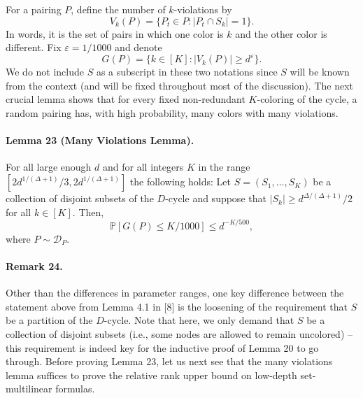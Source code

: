 For a pairing $P$, define the number of $k$-violations by
\[V_k(P)=\{P_t\in P:|P_t\cap S_k|=1\}.\]
In words, it is the set of pairs in which one color is $k$ and the other color is different. Fix $\varepsilon=1/1000$ and denote
\[G(P)=\{k\in[K]:|V_k(P)|\geq d^\varepsilon\}.\]
We do not include $S$ as a subscript in these two notations since $S$ will be known from the context (and will be fixed throughout most of the discussion). The next crucial lemma shows that for every fixed non-redundant $K$-coloring of the cycle, a random pairing has, with high probability, many colors with many violations.
\paragraph{Lemma 23 (Many Violations Lemma).} For all large enough $d$ and for all integers $K$ in the range $[2d^{1/(\Delta+1)}/3,2d^{1/(\Delta+1)}]$ the following holds: Let $S=(S_1,\ldots,S_K)$ be a collection of disjoint subsets of the $D$-cycle and suppose that $|S_k|\geq d^{\Delta/(\Delta+1)}/2$ for all $k\in[K]$. Then,
\[\mathbb P[G(P)\leq K/1000]\leq d^{-K/500},\]
where $P\sim\mathcal D_P$.
\paragraph{Remark 24.} Other than the differences in parameter ranges, one key difference between the statement above from Lemma 4.1 in [8] is the loosening of the requirement that $S$ be a partition of the $D$-cycle. Note that here, we only demand that $S$ be a collection of disjoint subsets (i.e., some nodes are allowed to remain uncolored) -- this requirement is indeed key for the inductive proof of Lemma 20 to go through.
Before proving Lemma 23, let us next see that the many violations lemma suffices to prove the relative rank upper bound on low-depth set-multilinear formulas.
